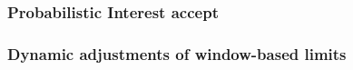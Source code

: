 



\subsubsection{\textbf{Probabilistic Interest accept}}
\label{sec:probabilistic}




\subsubsection{\textbf{Dynamic adjustments of window-based limits}}
\label{sec:dynamic limits}



